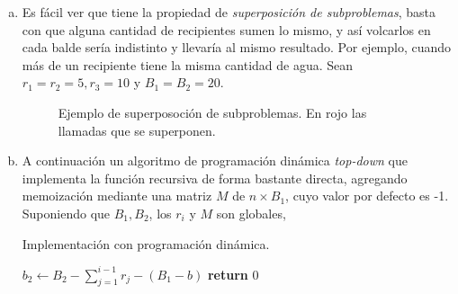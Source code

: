 \documentclass[12pt, a4paper]{report}
\theoremstyle{definition} %
\begin{document}
\begin{enumerate}[a)]
    \item Es fácil ver que tiene la propiedad de \textit{superposición de subproblemas}, basta con que alguna cantidad de recipientes sumen lo mismo, y así volcarlos en cada balde sería indistinto y llevaría al mismo resultado. Por ejemplo, cuando más de un recipiente tiene la misma cantidad de agua. Sean $r_1 = r_2 = 5, r_3 = 10$ y $B_1 = B_2 = 20$.
    
    \begin{figure}[H]
        \centering
        \caption{Ejemplo de superposoción de subproblemas. En rojo las llamadas que se superponen.}
    \end{figure}

    \item A continuación un algoritmo de programación dinámica \textit{top-down} que implementa la función recursiva de forma bastante directa, agregando memoización mediante una matriz $M$ de $n \times B_1$, cuyo valor por defecto es -1. Suponiendo que $B_1, B_2$, los $r_i$ y $M$ son globales,
    
    \begin{algorithm}[H]
        \caption{Implementación con programación dinámica.}
        \begin{algorithmic}[1]
                \State $b_2\gets B_2 - \sum_{j=1}^{i-1} r_j - (B_1 - b)$ 
                    \State \textbf{return} 0
                \EndIf


\end{algorithmic}
\end{algorithm}
\end{enumerate}
\end{document}
